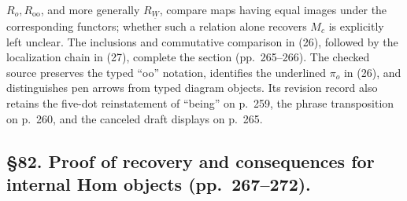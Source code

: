 \documentclass[10pt,oneside]{book}
\begin{document}
$R_o,R_{\mathrm{oo}}$, and more generally $R_{\underline{W}}$, compare maps having equal images under the corresponding functors; whether such a relation alone recovers $M_c$ is explicitly left unclear. The inclusions and commutative comparison in (26), followed by the localization chain in (27), complete the section (pp.\ 265--266). The checked source preserves the typed “oo” notation, identifies the underlined $\pi_o$ in (26), and distinguishes pen arrows from typed diagram objects. Its revision record also retains the five-dot reinstatement of “being” on p.\ 259, the phrase transposition on p.\ 260, and the canceled draft displays on p.\ 265.

\subsection*{\S82. Proof of recovery and consequences for internal Hom objects (pp.\ 267--272).}
\end{document}
